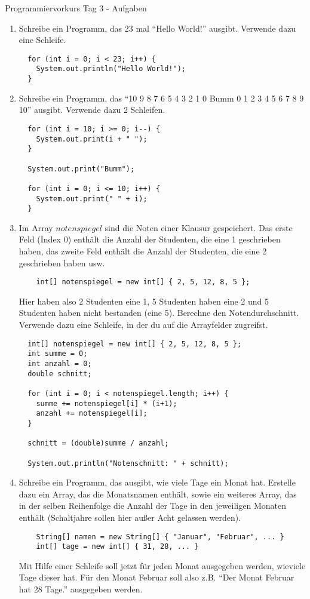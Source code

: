 \documentclass[final,a4paper]{article}
\begin{document}


{\huge Programmiervorkurs Tag 3 - Aufgaben}

\bigskip

\begin{enumerate}
  \item{
	Schreibe ein Programm, das 23 mal "`Hello World!"' ausgibt. Verwende dazu eine Schleife.

	\begin{lstlisting}
  for (int i = 0; i < 23; i++) {
	System.out.println("Hello World!");
  }
	\end{lstlisting}
	}
  \item{
	Schreibe ein Programm, das "`10 9 8 7 6 5 4 3 2 1 0 Bumm 0 1 2 3 4 5 6 7 8 9 10"' ausgibt.
	Verwende dazu 2 Schleifen.

	\begin{lstlisting}
  for (int i = 10; i >= 0; i--) {
	System.out.print(i + " ");
  }

  System.out.print("Bumm");

  for (int i = 0; i <= 10; i++) {
	System.out.print(" " + i);
  }
	\end{lstlisting}
	}
  \item{
	Im Array $notenspiegel$ sind die Noten einer Klausur gespeichert. Das erste Feld (Index $0$)
	enthält die Anzahl der Studenten, die eine 1 geschrieben haben, das zweite Feld enthält
	die Anzahl der Studenten, die eine 2 geschrieben haben usw.
	\begin{lstlisting}
	int[] notenspiegel = new int[] { 2, 5, 12, 8, 5 };
	\end{lstlisting}
	Hier haben also 2 Studenten eine 1, 5 Studenten haben eine 2 und 5 Studenten haben nicht bestanden (eine 5).
	Berechne den Notendurchschnitt. Verwende dazu eine Schleife, in der du auf die
	Arrayfelder zugreifst.

	\begin{lstlisting}
  int[] notenspiegel = new int[] { 2, 5, 12, 8, 5 };
  int summe = 0;
  int anzahl = 0;
  double schnitt;

  for (int i = 0; i < notenspiegel.length; i++) {
	summe += notenspiegel[i] * (i+1);
	anzahl += notenspiegel[i];
  }

  schnitt = (double)summe / anzahl;

  System.out.println("Notenschnitt: " + schnitt);
	\end{lstlisting}
	}
  \item{
	Schreibe ein Programm, das ausgibt, wie viele Tage ein Monat hat. Erstelle dazu ein Array,
	das die Monatsnamen enthält, sowie ein weiteres Array, das in der selben Reihenfolge die Anzahl
	der Tage in den jeweiligen Monaten enthält (Schaltjahre sollen hier außer Acht gelassen werden).
	\begin{lstlisting}
	String[] namen = new String[] { "Januar", "Februar", ... }
	int[] tage = new int[] { 31, 28, ... }
	\end{lstlisting}
	Mit Hilfe einer Schleife soll jetzt für jeden Monat ausgegeben werden, wieviele Tage dieser hat.
	Für den Monat Februar soll also z.B. "`Der Monat Februar hat 28 Tage."' ausgegeben werden.

}
\end{enumerate}
\end{document}
